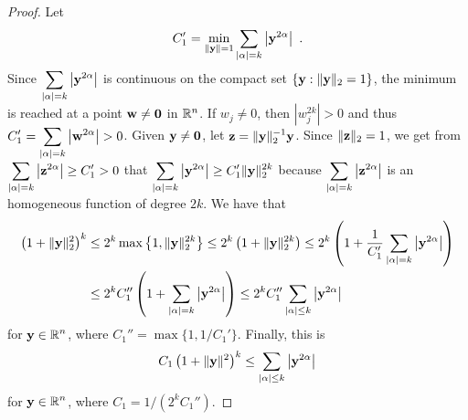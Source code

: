 \begin{proof}
 Let
\begin{equation} \label{sob_equi_Hk}
C_1' = \min_{\|\mathbf{y}\|=1} \sum_{|\alpha|= k} \left|\mathbf{y}^{2\alpha}\right| \ .
\end{equation}
Since $\displaystyle \sum_{|\alpha|= k} \left|\mathbf{y}^{2\alpha}\right|$ is 
continuous on the compact set $\{\mathbf{y} : \|\mathbf{y}\|_2=1\}$, the
minimum is reached at a point $\mathbf{w} \neq \mathbf{0}$ in $\mathbb{R}^n$.
If $w_j \neq 0$, then $\displaystyle \left| w_j^{2k}\right| >0$ and thus
$\displaystyle C_1' = \sum_{|\alpha|= k} \left|\mathbf{w}^{2\alpha}\right| >0$.
Given $\mathbf{y} \neq \mathbf{0}$, let $\mathbf{z} = \|\mathbf{y}\|_2^{-1} \mathbf{y}$.
Since $\|\mathbf{z}\|_2 = 1$, we get from
$\displaystyle \sum_{|\alpha|= k} \left|\mathbf{z}^{2\alpha}\right| \geq
C_1' >0$ that
$\displaystyle \sum_{|\alpha|= k} \left|\mathbf{y}^{2\alpha}\right| \geq C_1'
\|\mathbf{y}\|_2^{2k}$
because $\displaystyle \sum_{|\alpha|= k} \left|\mathbf{z}^{2\alpha}\right|$
is an homogeneous function of degree $2k$.  We have that
\begin{align*}
\left(1+\|\mathbf{y}\|_2^2\right)^k &\leq
2^k \max\left\{1, \|\mathbf{y}\|_2^{2k}\right\}
\leq 2^k \left( 1+ \|\mathbf{y}\|_2^{2k}\right)
\leq 2^k \left( 1 + \frac{1}{C_1' } \sum_{|\alpha|= k}
\left|\mathbf{y}^{2\alpha}\right| \right) \\
&\leq 2^k C_1'' \left( 1 + \sum_{|\alpha|= k}
\left|\mathbf{y}^{2\alpha}\right| \right)
\leq 2^k C_1'' \sum_{|\alpha|\leq k} \left|\mathbf{y}^{2\alpha}\right|
\end{align*}
for $\displaystyle \mathbf{y} \in \mathbb{R}^n$, where
$\displaystyle C_1'' = \max \{ 1 , 1/C_1'\}$.
Finally, this is
\[
C_1 \left(1+\|\mathbf{y}\|^2\right)^k
\leq \sum_{|\alpha|\leq k} \left|\mathbf{y}^{2\alpha}\right|
\]
for $\displaystyle \mathbf{y} \in \mathbb{R}^n$, where
$\displaystyle C_1 = 1/(2^k C_1'')$.


\end{proof}
